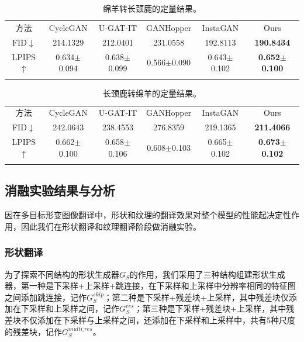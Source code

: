 \begin{table}[ht]
  \centering
  \caption{绵羊转长颈鹿的定量结果。}
    \begin{tabular}{c|c|c|c|c|c}
      \hline\noalign{\smallskip}
      方法 & CycleGAN & U-GAT-IT & GANHopper & InstaGAN & Ours \\
      \noalign{\smallskip}\hline\noalign{\smallskip}
      FID$\downarrow$   & 214.1329 & 212.0401 & 231.0558 & 192.8113 & \textbf{190.8434} \\
      LPIPS$\uparrow$ & 0.634$\pm$0.094 & 0.638$\pm$0.099 & 0.566$\pm$0.090 & 0.643$\pm$0.102 & \textbf{0.652$\pm$0.100} \\
    \noalign{\smallskip}\hline
    \end{tabular}
  \label{tab:shp2gir}
\end{table}

\begin{table}[ht]
  \centering
  \caption{长颈鹿转绵羊的定量结果。}
    \begin{tabular}{c|c|c|c|c|c}
      \hline\noalign{\smallskip}
      方法 & CycleGAN & U-GAT-IT & GANHopper & InstaGAN & Ours \\
      \noalign{\smallskip}\hline\noalign{\smallskip}
      FID$\downarrow$   & 242.0643 & 238.4553 & 276.8359 & 219.1365 & \textbf{211.4066} \\
      LPIPS$\uparrow$ & 0.662$\pm$0.100 & 0.658$\pm$0.106 & 0.608$\pm$0.103 & 0.665$\pm$0.102 & \textbf{0.673$\pm$0.102} \\
    \noalign{\smallskip}\hline
    \end{tabular}
  \label{tab:gir2shp}
\end{table}

\subsection{消融实验结果与分析}

因在多目标形变图像翻译中，形状和纹理的翻译效果对整个模型的性能起决定性作用，因此我们在形状翻译和纹理翻译阶段做消融实验。

\subsubsection{形状翻译}

为了探索不同结构的形状生成器$G_S$的作用，我们采用了三种结构组建形状生成器，第一种是下采样+上采样+跳连接，在下采样和上采样中分辨率相同的特征图之间添加跳连接，记作$G_S^{skip}$；第二种是下采样+残差块+上采样，其中残差块仅添加在下采样和上采样之间，记作$G_S^{res}$；第三种是下采样+残差块+上采样，其中残差块不仅添加在下采样与上采样之间，还添加在下采样和上采样中，共有5种尺度的残差块，记作$G_S^{multi\_res}$。

